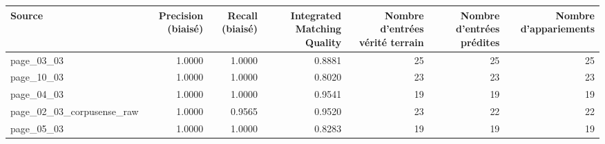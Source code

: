 \begin{tabular}{lrrrrrr}
\toprule
Source & Precision (biaisé) & Recall (biaisé) & Integrated Matching Quality & Nombre d'entrées vérité terrain & Nombre d'entrées prédites & Nombre d'appariements \\
\midrule
page\_03\_03 & 1.0000 & 1.0000 & 0.8881 & 25 & 25 & 25 \\
page\_10\_03 & 1.0000 & 1.0000 & 0.8020 & 23 & 23 & 23 \\
page\_04\_03 & 1.0000 & 1.0000 & 0.9541 & 19 & 19 & 19 \\
page\_02\_03\_corpusense\_raw & 1.0000 & 0.9565 & 0.9520 & 23 & 22 & 22 \\
page\_05\_03 & 1.0000 & 1.0000 & 0.8283 & 19 & 19 & 19 \\
\bottomrule
\end{tabular}
